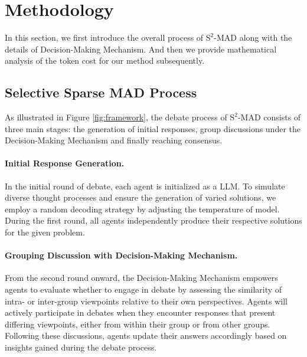\section{Methodology}

\label{sec:methodology}


In this section, we first introduce the overall process of \({\text{S}^2\text{-MAD}}\) along with the details of Decision-Making Mechanism. And then we provide mathematical analysis of the token cost for our method subsequently.


\subsection{Selective Sparse MAD Process} \label{}

As illustrated in Figure \ref{fig:framework}, the debate process of \({\text{S}^2\text{-MAD}}\) consists of three main stages: the generation of initial responses, group discussions under the Decision-Making Mechanism and finally reaching consensus. 

\paragraph{Initial Response Generation.} In the initial round of debate, each agent is initialized as a LLM. To simulate diverse thought processes and ensure the generation of varied solutions, we employ a random decoding strategy by adjusting the temperature of model. During the first round, all agents independently produce their respective solutions for the given problem. 


\paragraph{Grouping Discussion with Decision-Making Mechanism.} From the second round onward, the Decision-Making Mechanism empowers agents to evaluate whether to engage in debate by assessing the similarity of intra- or inter-group viewpoints relative to their own perspectives. Agents will actively participate in debates when they encounter responses that present differing viewpoints, either from within their group or from other groups. Following these discussions, agents update their answers accordingly based on insights gained during the debate process. 

